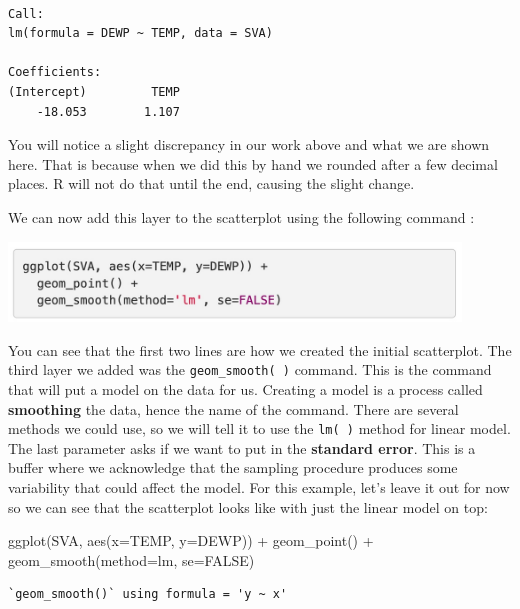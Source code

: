 \documentclass[
  letterpaper,
  DIV=11,
  numbers=noendperiod]{scrreprt}
\newenvironment{Shaded}{\begin{snugshade}}{\end{snugshade}}
\newcommand{\AttributeTok}[1]{\textcolor[rgb]{0.40,0.45,0.13}{#1}}
\newcommand{\ConstantTok}[1]{\textcolor[rgb]{0.56,0.35,0.01}{#1}}
\newcommand{\FunctionTok}[1]{\textcolor[rgb]{0.28,0.35,0.67}{#1}}
\newcommand{\NormalTok}[1]{\textcolor[rgb]{0.00,0.23,0.31}{#1}}
\newcommand{\SpecialCharTok}[1]{\textcolor[rgb]{0.37,0.37,0.37}{#1}}
\newcommand{\StringTok}[1]{\textcolor[rgb]{0.13,0.47,0.30}{#1}}
\begin{document}
\begin{verbatim}

Call:
lm(formula = DEWP ~ TEMP, data = SVA)

Coefficients:
(Intercept)         TEMP  
    -18.053        1.107  
\end{verbatim}

You will notice a slight discrepancy in our work above and what we are
shown here. That is because when we did this by hand we rounded after a
few decimal places. R will not do that until the end, causing the slight
change.

We can now add this layer to the scatterplot using the following command
:

\includegraphics[width=0.9\textwidth,height=\textheight]{./images/LMR_11.jpg}

You can see that the first two lines are how we created the initial
scatterplot. The third layer we added was the \texttt{geom\_smooth(\ )}
command. This is the command that will put a model on the data for us.
Creating a model is a process called \textbf{smoothing} the data, hence
the name of the command. There are several methods we could use, so we
will tell it to use the \texttt{lm(\ )} method for linear model. The
last parameter asks if we want to put in the \textbf{standard error}.
This is a buffer where we acknowledge that the sampling procedure
produces some variability that could affect the model. For this example,
let's leave it out for now so we can see that the scatterplot looks like
with just the linear model on top:

\begin{Shaded}
\begin{Highlighting}[]
\FunctionTok{ggplot}\NormalTok{(SVA, }\FunctionTok{aes}\NormalTok{(}\AttributeTok{x=}\NormalTok{TEMP, }\AttributeTok{y=}\NormalTok{DEWP)) }\SpecialCharTok{+}
  \FunctionTok{geom\_point}\NormalTok{() }\SpecialCharTok{+}
  \FunctionTok{geom\_smooth}\NormalTok{(}\AttributeTok{method=}\StringTok{\textquotesingle{}lm\textquotesingle{}}\NormalTok{, }\AttributeTok{se=}\ConstantTok{FALSE}\NormalTok{)}
\end{Highlighting}
\end{Shaded}

\begin{verbatim}
`geom_smooth()` using formula = 'y ~ x'
\end{verbatim}
\end{document}
